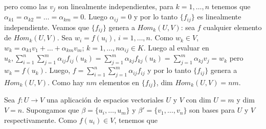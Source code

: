  		pero como las $ v_{j} $ son linealmente independientes, para $ k = 1, \ldots , n $ tenemos que $\alpha_{k1} = \alpha_{k2} = \ldots = \alpha_{km} = 0$. Luego $\alpha_{ij} = 0 $ y por lo tanto $ \{f_{ij}\} $ es linealmente independiente.
 		Veamos que $ \{f_{ij}\} $ genera a $ H om_{k}(U, V)$: sea $ f $ cualquier elemento de $ H om_{k}(U, V)$. Sea $ w_{i} = f(u_{i})$, $ i = 1, \ldots, n $. Como $ w_{k} \in V $, $ w_{k} = \alpha_{k1}v_{1}+\ldots+\alpha_{km}v_{m} $; $ k = 1, \ldots, n $$ \alpha_{ij} \in K $. Luego al evaluar en $ u_{k},  \sum_{i=1}^{n} \sum_{j=1}^{m} \alpha_{ij} f_{ij} (u_{k})  =  \sum_{j=1}^{m} \alpha_{kj} f_{kj} (u_{k})  =  \sum_{j=1}^{m} \alpha_{kj} v_{j} = w_{k} $ pero $ w_{k} = f(u_{k}) $. Luego, $ f =  \sum_{i=1}^{n} \sum_{j=1}^{m} \alpha_{ij} f_{ij} $ y por lo tanto $ \{f_{ij}\} $ genera a  $ H om_{k} (U, V) $. Como hay $ nm $ elementos en $ \{f_{ij}\} $, dim $ H om_{k} (U, V) = nm$.
 		
 		Sea $ f:U \rightarrow V $ una aplicación de espacios vectoriales $ U $ y $ V $ con dim $ U = m $ y  dim $ V = n $. Supongamos que $ \beta = \{u_{i}, \ldots, u_{m}\} $ y $ \beta' = \{v_{1}, \ldots, v_{n}\} $ son bases para $ U $ y $ V $ respectivamente. Como $ f(u_{i}) \in V $, tenemos que 
 		
